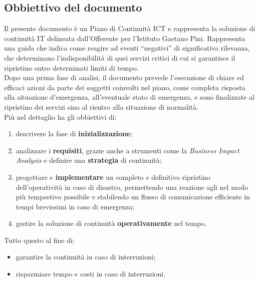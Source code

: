 \subsection{Obbiettivo del documento}
Il presente documento è un Piano di Continuità ICT e rappresenta la soluzione di continuità IT delineata dall'Offerente per l'Istituto Gaetano Pini. Rappresenta   una  guida che  indica  come  reagire  ad  eventi  “negativi”  di significativa rilevanza, che determinano l’indisponibilità di quei servizi critici di cui si garantisce il ripristino entro determinati limiti di tempo.\\
Dopo una prima fase di analisi, il documento prevede l’esecuzione di chiare ed efficaci azioni da  parte  dei  soggetti  coinvolti nel  piano,  come  completa  risposta  alla  situazione d’emergenza,  all’eventuale  stato  di  emergenza,  e  sono  finalizzate  al  ripristino  dei  servizi  sino  al  rientro alla situazione di normalità.  \\
Più nel dettaglio ha gli obbiettivi di:
\begin{enumerate}
\item descrivere la fase di \textbf{inizializzazione};
\item analizzare i \textbf{requisiti}, grazie anche a strumenti come la \textit{Business Impact Analysis} e definire una \textbf{strategia} di continuità;
\item progettare e \textbf{implementare} un completo e definitivo ripristino dell’operatività in caso di disastro, permettendo una reazione agli nel modo più tempestivo possibile e stabilendo un flusso di comunicazione efficiente in tempi brevissimi in caso di emergenza;
\item gestire la soluzione di continuità \textbf{operativamente} nel tempo.
\end{enumerate}
Tutto questo al fine di:
\begin{itemize}
\item garantire la continuità in caso di interruzioni;
\item risparmiare tempo e costi in caso di interruzioni.
\end{itemize}

